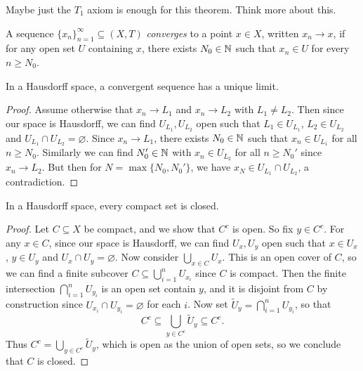 \begin{remark}
  Maybe just the $T_1$ axiom is enough for this
  theorem. Think more about this.
\end{remark}

\begin{definition}
  A sequence $\{x_n\}_{n = 1}^\infty \subseteq (X, T)$
  \emph{converges} to a point $x \in X$, written
  $x_n \to x$, if for any open set $U$ containing $x$,
  there exists $N_0 \in \mathbb{N}$ such that
  $x_n \in U$ for every $n \ge N_0$.
\end{definition}

\begin{theorem}
  In a Hausdorff space, a convergent sequence has a
  unique limit.
\end{theorem}

\begin{proof}
  Assume otherwise that $x_n \to L_1$ and
  $x_n \to L_2$ with $L_1 \ne L_2$. Then since our
  space is Hausdorff, we can find
  $U_{L_1}, U_{L_2}$ open such that
  $L_1 \in U_{L_1}$, $L_2 \in U_{L_2}$ and
  $U_{L_1} \cap U_{L_2} = \varnothing$. Since
  $x_n \to L_1$, there exists $N_0 \in \mathbb{N}$ such
  that $x_n \in U_{L_1}$ for all $n \ge N_0$.
  Similarly we can find $N_0' \in \mathbb{N}$ with
  $x_n \in U_{L_2}$ for all $n \ge N_0'$ since
  $x_n \to L_2$. But then for $N = \max\{N_0, N_0'\}$,
  we have $x_N \in U_{L_1} \cap U_{L_2}$,
  a contradiction.
\end{proof}

\begin{theorem}
  In a Hausdorff space, every compact set is closed.
\end{theorem}

\begin{proof}
  Let $C \subseteq X$ be compact, and we show
  that $C^c$ is open. So fix $y \in C^c$.
  For any $x \in C$, since our space is Hausdorff,
  we can find $U_x, U_y$ open such that
  $x \in U_x$, $y \in U_y$ and $U_x \cap U_y = \varnothing$.
  Now consider $\bigcup_{x \in C} U_x$. This is
  an open cover of $C$, so we can find a finite
  subcover $C \subseteq \bigcup_{i = 1}^n U_{x_i}$
  since $C$ is compact. Then the finite intersection
  $\bigcap_{i = 1}^n U_{y_i}$ is an open set contain
  $y$, and it is disjoint from $C$ by construction
  since $U_{x_i} \cap U_{y_i} = \varnothing$ for each $i$.
  Now set $\widetilde{U}_y = \bigcap_{i = 1}^n U_{y_i}$, so that
  \[
    C^c \subseteq \bigcup_{y \in C^c} \widetilde{U}_y
    \subseteq C^c.
  \]
  Thus $C^c = \bigcup_{y \in C^c} \widetilde{U}_y$,
  which is open as the union of open sets, so
  we conclude that $C$ is closed.
\end{proof}
